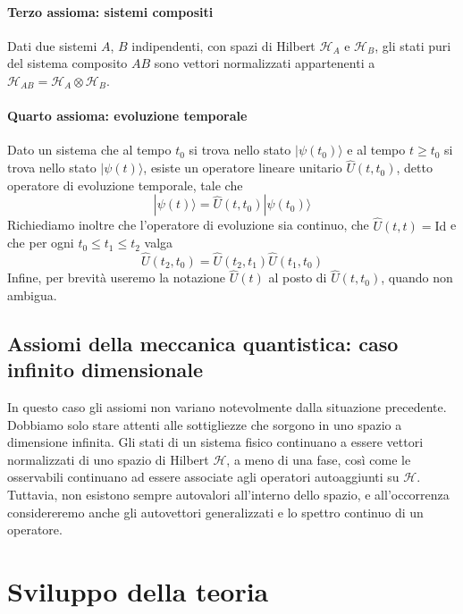 \documentclass[a4paper, 11pt]{article}
\renewcommand{\H}{\mathcal{H}}
\newcommand{\id}{\mathrm{Id}}
\renewcommand{\ket}[1]{| #1\rangle}
\begin{document}
\paragraph{Terzo assioma: sistemi compositi} Dati due sistemi $A$, $B$ indipendenti, con spazi di Hilbert $\H_A$ e $\H_B$, gli stati puri del sistema composito $AB$ sono vettori normalizzati appartenenti a $\H_{AB}=\H_A\otimes\H_B$.
\paragraph{Quarto assioma: evoluzione temporale} Dato un sistema che al tempo $t_0$ si trova nello stato $\ket{\psi(t_0)}$ e al tempo $t\geq t_0$ si trova nello stato $\ket{\psi(t)}$, esiste un operatore lineare unitario $\hat U(t,t_0)$, detto operatore di evoluzione temporale, tale che
\[\ket{\psi(t)}=\hat U(t,t_0)\ket{\psi(t_0)}\]
Richiediamo inoltre che l'operatore di evoluzione sia continuo, che $\hat U(t,t)=\id$ e che per ogni $t_0\leq t_1\leq t_2$ valga
\[\hat U(t_2,t_0)=\hat U(t_2,t_1)\hat U(t_1,t_0)\]
Infine, per brevità useremo la notazione $\hat{U}(t)$ al posto di $\hat{U}(t,t_0)$, quando non ambigua.
\subsection{Assiomi della meccanica quantistica: caso infinito dimensionale}
In questo caso gli assiomi non variano notevolmente dalla situazione precedente. Dobbiamo solo stare attenti alle sottigliezze che sorgono in uno spazio a dimensione infinita. Gli stati di un sistema fisico continuano a essere vettori normalizzati di uno spazio di Hilbert $\H$, a meno di una fase, così come le osservabili continuano ad essere associate agli operatori autoaggiunti su $\H$. Tuttavia, non esistono sempre autovalori all'interno dello spazio, e all'occorrenza considereremo anche gli autovettori generalizzati e lo spettro continuo di un operatore.
\newpage
\section{Sviluppo della teoria}
\end{document}

